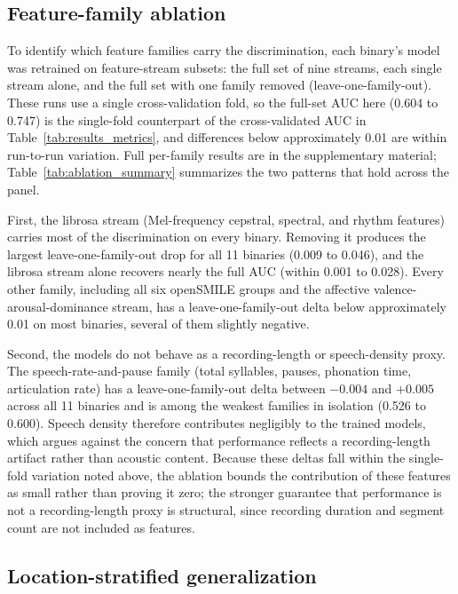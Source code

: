 \documentclass[utf8]{FrontiersinHarvard} %
\begin{document}
\subsection{Feature-family ablation}
\label{sec:results-ablation}

To identify which feature families carry the discrimination, each binary's model was retrained on feature-stream subsets: the full set of nine streams, each single stream alone, and the full set with one family removed (leave-one-family-out). These runs use a single cross-validation fold, so the full-set AUC here (0.604 to 0.747) is the single-fold counterpart of the cross-validated AUC in Table~\ref{tab:results_metrics}, and differences below approximately 0.01 are within run-to-run variation. Full per-family results are in the supplementary material; Table~\ref{tab:ablation_summary} summarizes the two patterns that hold across the panel.

First, the librosa stream (Mel-frequency cepstral, spectral, and rhythm features) carries most of the discrimination on every binary. Removing it produces the largest leave-one-family-out drop for all 11 binaries (0.009 to 0.046), and the librosa stream alone recovers nearly the full AUC (within 0.001 to 0.028). Every other family, including all six openSMILE groups and the affective valence-arousal-dominance stream, has a leave-one-family-out delta below approximately 0.01 on most binaries, several of them slightly negative.

Second, the models do not behave as a recording-length or speech-density proxy. The speech-rate-and-pause family (total syllables, pauses, phonation time, articulation rate) has a leave-one-family-out delta between $-0.004$ and $+0.005$ across all 11 binaries and is among the weakest families in isolation (0.526 to 0.600). Speech density therefore contributes negligibly to the trained models, which argues against the concern that performance reflects a recording-length artifact rather than acoustic content. Because these deltas fall within the single-fold variation noted above, the ablation bounds the contribution of these features as small rather than proving it zero; the stronger guarantee that performance is not a recording-length proxy is structural, since recording duration and segment count are not included as features.

\subsection{Location-stratified generalization}
\label{sec:results-location}
\end{document}
